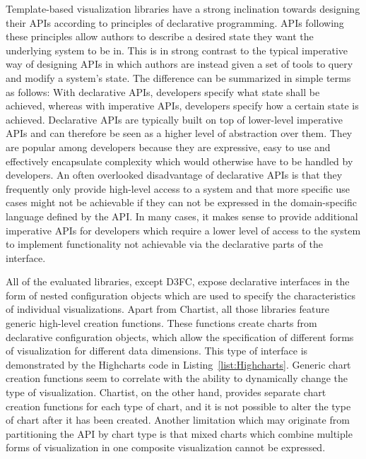 Template-based visualization libraries have a strong inclination
towards designing their APIs according to principles of declarative
programming.  APIs following these principles allow authors to
describe a desired state they want the underlying system to be in.
This is in strong contrast to the typical imperative way of designing
APIs in which authors are instead given a set of tools to query and
modify a system's state. The difference can be summarized in simple
terms as follows: With declarative APIs, developers specify what state
shall be achieved, whereas with imperative APIs, developers specify
how a certain state is achieved. Declarative APIs are typically built
on top of lower-level imperative APIs and can therefore be seen as a
higher level of abstraction over them. They are popular among
developers because they are expressive, easy to use and effectively
encapsulate complexity which would otherwise have to be handled by
developers. An often overlooked disadvantage of declarative APIs is
that they frequently only provide high-level access to a system and
that more specific use cases might not be achievable if they can not
be expressed in the domain-specific language defined by the API. In
many cases, it makes sense to provide additional imperative APIs for
developers which require a lower level of access to the system to
implement functionality not achievable via the declarative parts of
the interface.

All of the evaluated libraries, except D3FC, expose declarative
interfaces in the form of nested configuration objects which are used
to specify the characteristics of individual visualizations. Apart
from Chartist, all those libraries feature generic high-level creation
functions. These functions create charts from declarative
configuration objects, which allow the specification of different
forms of visualization for different data dimensions. This type of
interface is demonstrated by the Highcharts code in
Listing~\ref{list:Highcharts}. Generic chart creation functions seem
to correlate with the ability to dynamically change the type of
visualization. Chartist, on the other hand, provides separate chart
creation functions for each type of chart, and it is not possible to
alter the type of chart after it has been created. Another limitation
which may originate from partitioning the API by chart type is that
mixed charts which combine multiple forms of visualization in one
composite visualization cannot be expressed.


\begin{samepage}
%
A basic column (vertical bar) chart defined using Highcharts' generic
chart creation API. A high-level, declarative configuration object is
passed to the creation function.
},
]{listings/highcharts.js}
\end{samepage}



